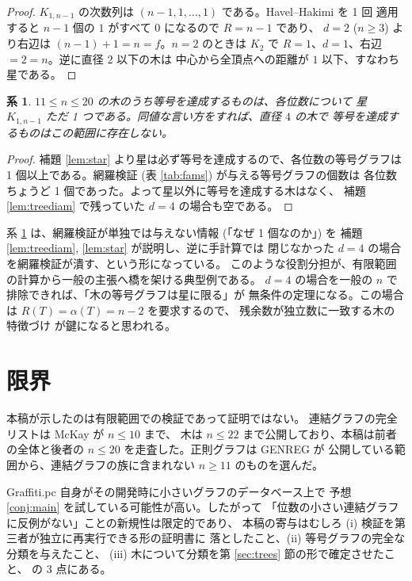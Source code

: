 \documentclass[paper=a4,fontsize=10.5pt,jafontsize=10.5pt]{jlreq}
\theoremstyle{plain}
\newtheorem{corollary}[theorem]{系}
\theoremstyle{definition}
\begin{document}
\begin{proof}
$K_{1,n-1}$ の次数列は $(n-1, 1, \dots, 1)$ である。Havel--Hakimi を 1 回
適用すると $n-1$ 個の $1$ がすべて $0$ になるので $R = n-1$ であり、
$d = 2$ ($n \ge 3$) より右辺は $(n-1) + 1 = n = f$。$n = 2$ のときは
$K_2$ で $R = 1$、$d = 1$、右辺 $= 2 = n$。逆に直径 $2$ 以下の木は
中心から全頂点への距離が $1$ 以下、すなわち星である。
\end{proof}

\begin{corollary}\label{cor:tree}
$11 \le n \le 20$ の木のうち等号を達成するものは、各位数について
星 $K_{1,n-1}$ ただ 1 つである。同値な言い方をすれば、直径 $4$ の木で
等号を達成するものはこの範囲に存在しない。
\end{corollary}

\begin{proof}
補題 \ref{lem:star} より星は必ず等号を達成するので、各位数の等号グラフは
1 個以上である。網羅検証 (表 \ref{tab:fams}) が与える等号グラフの個数は
各位数ちょうど 1 個であった。よって星以外に等号を達成する木はなく、
補題 \ref{lem:treediam} で残っていた $d = 4$ の場合も空である。
\end{proof}

系 \ref{cor:tree} は、網羅検証が単独では与えない情報 (「なぜ 1 個なのか」) を
補題 \ref{lem:treediam}, \ref{lem:star} が説明し、逆に手計算では
閉じなかった $d = 4$ の場合を網羅検証が潰す、という形になっている。
このような役割分担が、有限範囲の計算から一般の主張へ橋を架ける典型例である。
$d = 4$ の場合を一般の $n$ で排除できれば、「木の等号グラフは星に限る」が
無条件の定理になる。この場合は $R(T) = \alpha(T) = n - 2$ を要求するので、
残余数が独立数に一致する木の特徴づけ \cite{fms1991} が鍵になると思われる。

\section{限界}

本稿が示したのは有限範囲での検証であって証明ではない。
連結グラフの完全リストは McKay \cite{mckay} が $n \le 10$ まで、
木は $n \le 22$ まで公開しており、本稿は前者の全体と後者の
$n \le 20$ を走査した。正則グラフは GENREG \cite{genreg} が
公開している範囲から、連結グラフの族に含まれない $n \ge 11$ のものを選んだ。

Graffiti.pc 自身がその開発時に小さいグラフのデータベース上で
予想 \ref{conj:main} を試している可能性が高い。したがって
「位数の小さい連結グラフに反例がない」ことの新規性は限定的であり、
本稿の寄与はむしろ (i) 検証を第三者が独立に再実行できる形の証明書に
落としたこと、(ii) 等号グラフの完全な分類を与えたこと、
(iii) 木について分類を第 \ref{sec:trees} 節の形で確定させたこと、
の 3 点にある。
\end{document}
